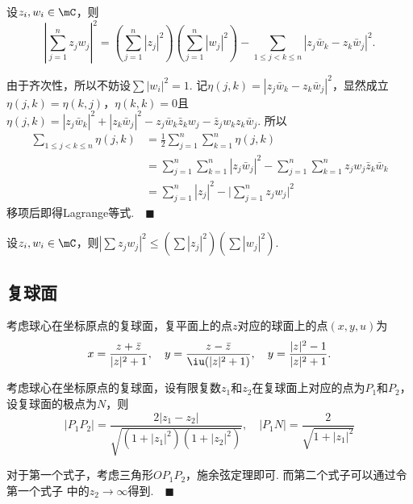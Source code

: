   \begin{thm}[Lagrange等式]
    设$z_i, w_i \in \mC$，则
    \[
      |\sum_{j=1}^n z_jw_j|^2 = \left(\sum_{j=1}^n|z_j|^2\right)
      \left(\sum_{j=1}^n|w_j|^2\right) - \sum_{1\le j<k\le n}
      |z_j\bar{w}_k - z_k\bar{w}_j|^2.
    \]
  \end{thm}
  \proof
    由于齐次性，所以不妨设$\sum |w_i|^2 = 1$. 记$\eta(j, k) =
    |z_j\bar{w}_k - z_k\bar{w}_j|^2$，显然成立
    $\eta(j, k) = \eta(k, j)$，$\eta(k, k) = 0$且$\eta(j, k)=
    |z_j\bar{w}_k|^2 + |z_k\bar{w}_j|^2 - z_j\bar{w}_k\bar{z}_kw_j
    - \bar{z}_jw_kz_k\bar{w}_j$. 所以
    \[\begin{split}
      \sum_{1\le j<k\le n}\eta(j, k)
      &= \frac{1}{2}\sum_{j=1}^n\sum_{k=1}^n\eta(j, k) \\
      &= \sum_{j=1}^n\sum_{k=1}^n|z_j\bar{w}_j|^2
          - \sum_{j=1}^n\sum_{k=1}^nz_jw_j\bar{z}_k\bar{w}_k \\
      &= \sum_{j=1}^n|z_j|^2 - \big| \sum_{j=1}^nz_jw_j \big|^2
    \end{split}\]
    移项后即得Lagrange等式.$\quad\blacksquare$

  \begin{cor}[Cauchy不等式]
    设$z_i, w_i \in \mC$，则$|\sum z_jw_j|^2 \le (\sum|z_j|^2)(\sum|w_j|^2)$.
  \end{cor}

\subsection{复球面} %
  
  \begin{pos}[复球面坐标]
    考虑球心在坐标原点的复球面，复平面上的点$z$对应的球面上的点$(x, y, u)$为
    \[
      x = \frac{z+\bar{z}}{|z|^2+1},\quad
      y = \frac{z-\bar{z}}{\iu(|z|^2+1)},\quad
      y = \frac{|z|^2-1}{|z|^2+1}.
    \]
  \end{pos}

  \begin{pos}[复球面上距离]
    考虑球心在坐标原点的复球面，设有限复数$z_1$和$z_2$在复球面上对应的点为$P_1$和$P_2$，
    设复球面的极点为$N$，则
    \[
      |P_1P_2| = \frac{2|z_1-z_2|}{\sqrt{(1+|z_1|^2)(1+|z_2|^2)}},\quad
      |P_1N| = \frac{2}{\sqrt{1+|z_1|^2}}
    \]
  \end{pos}
  \proof
    对于第一个式子，考虑三角形$OP_1P_2$，施余弦定理即可. 而第二个式子可以通过令第一个式子
    中的$z_2\to\infty$得到.$\quad\blacksquare$



